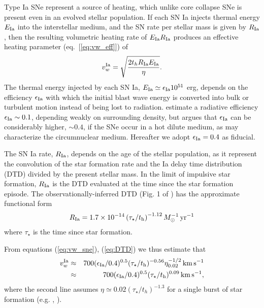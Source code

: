 \documentclass[usenatbib,fleqn]{mn2e}
\newcommand{\RateIa}{R_{\rm Ia}}
\begin{document}
Type Ia SNe represent a source of heating, which unlike core collapse SNe is present even in an evolved stellar population.  If each SN Ia injects thermal energy $E_{\rm Ia}$ into the interstellar medium, and the SN rate per stellar mass is given by $R_{\rm   Ia}$, then the resulting volumetric heating rate of $E_{\rm Ia}R_{\rm  Ia}$ produces an effective heating parameter (eq.~[\ref{eq:vw_eff}]) of \begin{align} v_{w}^{\rm Ia} =\sqrt{\frac{2 t_h R_{\rm Ia}
E_{\rm Ia}}{\eta}} \label{eq:vw_sne}.
\end{align} The thermal energy injected by each SN Ia, $E_{\rm Ia} \simeq
\epsilon_{\rm Ia} 10^{51}$ erg, depends on the efficiency $\epsilon_{\rm Ia}$
with which the initial blast wave energy is converted into bulk or turbulent
motion instead of being lost to radiation.  \cite{Thornton+98}
estimate a radiative efficiency $\epsilon_{\rm Ia} \sim 0.1$,
depending weakly on surrounding density, but \citet{Sharma+14} argues
that $\epsilon_{\rm Ia}$ can be considerably higher, $\sim 0.4$, if
the SNe occur in a hot dilute medium, as may characterize the circumnuclear medium.  Hereafter we adopt $\epsilon_{\rm Ia} = 0.4$ as fiducial.

The SN Ia rate, $\RateIa$, depends on the age of the stellar population, as it represent the convolution of the star formation rate and the Ia delay time distribution (DTD) divided by the present stellar mass.  In
the limit of impulsive star formation, $\RateIa$ is the DTD evaluated at the time since the star formation episode.  The observationally-inferred DTD (Fig. 1 of \citealt{MaozMannucci+:2012a}) has the
approximate functional form \begin{align}
  R_{\rm Ia} =1.7\times 10^{-14}\left(\tau_{\star}/t_{\rm
      h}\right)^{-1.12} M_{\odot}^{-1}\,{\rm yr^{-1}}
\label{eq:DTD}
  \end{align}
  where $\tau_{\star}$ is the time since star formation.

From equations (\ref{eq:vw_sne}), (\ref{eq:DTD}) we thus estimate that 
  \begin{eqnarray} 
    v_{w}^{\rm Ia} &\approx& 700(\epsilon_{\rm
      Ia}/0.4)^{0.5}(\tau_{\star}/t_{\rm h})^{-0.56}\eta_{0.02}^{-1/2}\,{\rm km
      \,s^{-1}} \nonumber \\
&\approx& 700(\epsilon_{\rm
      Ia}/0.4)^{0.5}(\tau_{\star}/t_{\rm h})^{0.09}\,{\rm km
      \,s^{-1}},
\label{eq:vIa}
  \end{eqnarray}
where the second line assumes $\eta\simeq 0.02 (\tau_{\star}/t_h)^{-1.3}$ for a single burst of star formation (e.g. , \citealt{Ciotti+91}).
\end{document}
